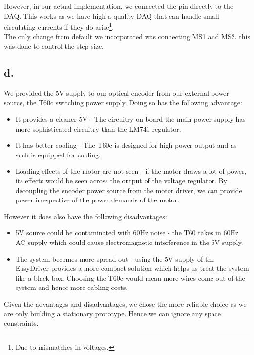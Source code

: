\documentclass{article}
\theoremstyle{plain}
\theoremstyle{definition}
\theoremstyle{remark}
\begin{document}
 However, in our actual implementation, we connected the pin directly to the DAQ. This works as we have high a quality DAQ that can handle small circulating currents if they do arise\footnote{Due to mismatches in voltages.}.\\

The only change from default we incorporated was connecting MS1 and MS2. this was done to control the step size. 


\subsection*{d.}
We provided the 5V supply to our optical encoder from our external power source, the T60c switching power supply. Doing so has the following advantage:
\begin{itemize}
\item It provides a cleaner 5V - The circuitry on board the main power supply has more sophisticated circuitry than the LM741 regulator.

\item It has better cooling - The T60c is designed for high power output and as such is equipped for cooling.

\item Loading effects of the motor are not seen - if the motor draws a lot of power, its effects would be seen across the output of the voltage regulator. By decoupling the encoder power source from the motor driver, we can provide power irrespective of the power demands of the motor.
\end{itemize}

However it does also have the following disadvantages:
\begin{itemize}
\item 5V source could be contaminated with 60Hz noise - the T60 takes in 60Hz AC supply which could cause electromagnetic interference in the 5V supply.

\item The system becomes more spread out - using the 5V supply of the EasyDriver provides a more compact solution which helps us treat the system like a black box. Choosing the T60c would mean more wires come out of the system and hence more cabling costs.

\end{itemize}

Given the advantages and disadvantages, we chose the more reliable choice as we are only building a stationary prototype. Hence we can ignore any space constraints.
\end{document}
